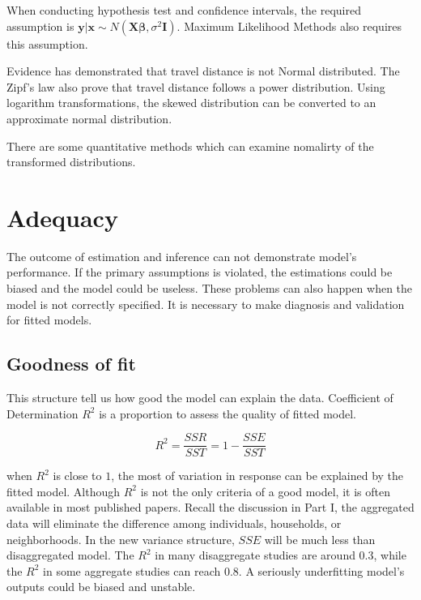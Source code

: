 \documentclass[
  11pt,
  openany]{memoir}
\begin{document}
When conducting hypothesis test and confidence intervals, the required assumption is \(\mathbf{y|x}\sim N (\mathbf{X}\boldsymbol{\beta},\sigma^2\mathbf{I})\). Maximum Likelihood Methods also requires this assumption.

Evidence has demonstrated that travel distance is not Normal distributed. The Zipf's law also prove that travel distance follows a power distribution. Using logarithm transformations, the skewed distribution can be converted to an approximate normal distribution.

There are some quantitative methods which can examine nomalirty of the transformed distributions.

\hypertarget{adequacy}{%
\section{Adequacy}\label{adequacy}}

The outcome of estimation and inference can not demonstrate model's performance.
If the primary assumptions is violated, the estimations could be biased and the model could be useless. These problems can also happen when the model is not correctly specified. It is necessary to make diagnosis and validation for fitted models.

\hypertarget{goodness-of-fit}{%
\subsection{Goodness of fit}\label{goodness-of-fit}}

This structure tell us how good the model can explain the data. Coefficient of Determination \(R^2\) is a proportion to assess the quality of fitted model.

\begin{equation}
R^2 =\frac{SSR}{SST}=1-\frac{SSE}{SST}
\label{eq:rsq}
\end{equation}

when \(R^2\) is close to \(1\), the most of variation in response can be explained by the fitted model. Although \(R^2\) is not the only criteria of a good model, it is often available in most published papers. Recall the discussion in Part I, the aggregated data will eliminate the difference among individuals, households, or neighborhoods. In the new variance structure, \(SSE\) will be much less than disaggregated model. The \(R^2\) in many disaggregate studies are around 0.3, while the \(R^2\) in some aggregate studies can reach 0.8. A seriously underfitting model's outputs could be biased and unstable.
\end{document}
